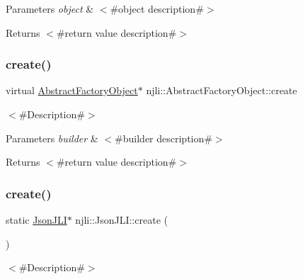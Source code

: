 \begin{DoxyParams}{Parameters}
{\em object} & $<$\#object description\#$>$\\
\hline
\end{DoxyParams}
\begin{DoxyReturn}{Returns}
$<$\#return value description\#$>$ 
\end{DoxyReturn}
\mbox{\label{classnjli_1_1_json_j_l_i_a83a8876ae63b92804004cf3febe76573}} 
\subsubsection{\texorpdfstring{create()}{create()}\hspace{0.1cm}{\footnotesize\ttfamily [1/3]}}
{\footnotesize\ttfamily virtual \mbox{\hyperlink{classnjli_1_1_abstract_factory_object}{Abstract\+Factory\+Object}}$\ast$ njli\+::\+Abstract\+Factory\+Object\+::create}

$<$\#\+Description\#$>$


\begin{DoxyParams}{Parameters}
{\em builder} & $<$\#builder description\#$>$\\
\hline
\end{DoxyParams}
\begin{DoxyReturn}{Returns}
$<$\#return value description\#$>$ 
\end{DoxyReturn}
\mbox{\label{classnjli_1_1_json_j_l_i_aa042d297050718c9c6f1d8f7a4eb42f6}} 
\subsubsection{\texorpdfstring{create()}{create()}\hspace{0.1cm}{\footnotesize\ttfamily [2/3]}}
{\footnotesize\ttfamily static \mbox{\hyperlink{classnjli_1_1_json_j_l_i}{Json\+J\+LI}}$\ast$ njli\+::\+Json\+J\+L\+I\+::create (\begin{DoxyParamCaption}{ }\end{DoxyParamCaption})\hspace{0.3cm}{\ttfamily [static]}}

$<$\#\+Description\#$>$

